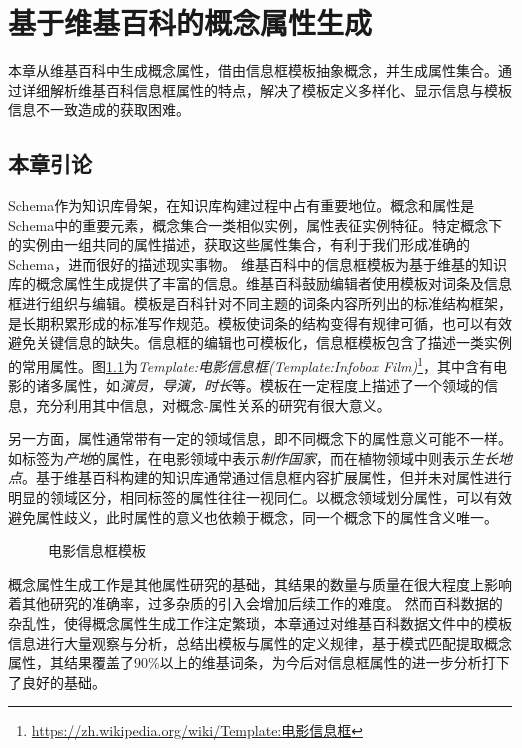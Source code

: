 \chapter{基于维基百科的概念属性生成}
\label{cha:concept-property}
本章从维基百科中生成概念属性，借由信息框模板抽象概念，并生成属性集合。通过详细解析维基百科信息框属性的特点，解决了模板定义多样化、显示信息与模板信息不一致造成的获取困难。

\section{本章引论}

Schema作为知识库骨架，在知识库构建过程中占有重要地位。概念和属性是Schema中的重要元素，概念集合一类相似实例，属性表征实例特征。特定概念下的实例由一组共同的属性描述，获取这些属性集合，有利于我们形成准确的Schema，进而很好的描述现实事物。
维基百科中的信息框模板为基于维基的知识库的概念属性生成提供了丰富的信息。维基百科鼓励编辑者使用模板对词条及信息框进行组织与编辑。模板是百科针对不同主题的词条内容所列出的标准结构框架，是长期积累形成的标准写作规范。模板使词条的结构变得有规律可循，也可以有效避免关键信息的缺失。信息框的编辑也可模板化，信息框模板包含了描述一类实例的常用属性。图\ref{fig:template-infobox-film}为\textit{Template:电影信息框(Template:Infobox Film)}\footnote{\url{https://zh.wikipedia.org/wiki/Template:电影信息框}}，其中含有电影的诸多属性，如\textit{演员，导演，时长}等。模板在一定程度上描述了一个领域的信息，充分利用其中信息，对概念-属性关系的研究有很大意义。

另一方面，属性通常带有一定的领域信息，即不同概念下的属性意义可能不一样。如标签为\textit{产地}的属性，在电影领域中表示\textit{制作国家}，而在植物领域中则表示\textit{生长地点}。基于维基百科构建的知识库通常通过信息框内容扩展属性，但并未对属性进行明显的领域区分，相同标签的属性往往一视同仁。以概念领域划分属性，可以有效避免属性歧义，此时属性的意义也依赖于概念，同一个概念下的属性含义唯一。

\begin{figure}[ht]
  \centering
  \caption{电影信息框模板}
  \label{fig:template-infobox-film}
\end{figure}

概念属性生成工作是其他属性研究的基础，其结果的数量与质量在很大程度上影响着其他研究的准确率，过多杂质的引入会增加后续工作的难度。
然而百科数据的杂乱性，使得概念属性生成工作注定繁琐，本章通过对维基百科数据文件中的模板信息进行大量观察与分析，总结出模板与属性的定义规律，基于模式匹配提取概念属性，其结果覆盖了90\%以上的维基词条，为今后对信息框属性的进一步分析打下了良好的基础。

